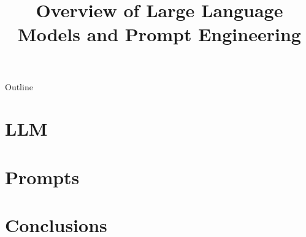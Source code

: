 \documentclass[xcolor=dvipsnames,compress,t,pdf,9pt]{beamer}
\title[\insertframenumber /\inserttotalframenumber]{Overview of Large Language Models and Prompt Engineering}
\begin{document}
	\begin{frame}
	\titlepage
	\end{frame}
	
	\begin{frame}{Outline}
	    \tableofcontents
	\end{frame}


	
	
	\section[LLM]{LLM}
	
	
	\section[Primpt]{Prompts}
	
	
	\section[Concl]{Conclusions}
	

	
\end{document}
